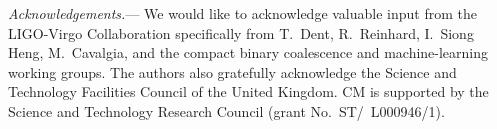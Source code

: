 \documentclass[%
showpacs,
 amsmath,amssymb,
 aps,
 twocolumn,
 prl,
 reprint,
floatfix,
]{revtex4-1}
\begin{document}
%
%
\emph{Acknowledgements.}---
%
We would like to acknowledge valuable input from the LIGO-Virgo Collaboration
specifically from T.~Dent, R.~Reinhard, I.~Siong Heng, M.~Cavalgia, and the compact binary coalescence and
machine-learning working groups. The authors also gratefully acknowledge the
Science and Technology Facilities Council of the United Kingdom. CM is
supported by the Science and Technology Research Council (grant
No.~ST/~L000946/1).
%




\end{document}
